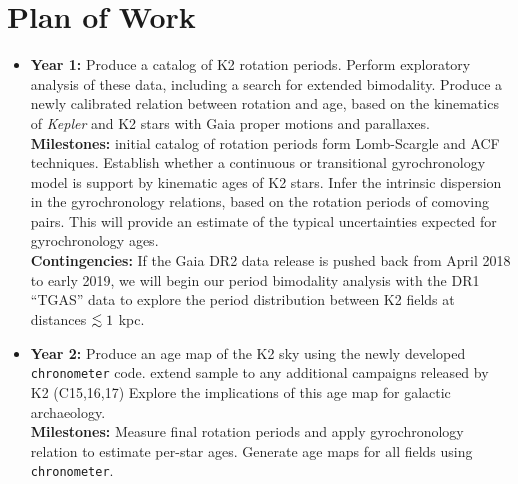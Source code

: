 \documentclass[12pt]{article}
\newcommand{\Kepler}{\textsl{Kepler}\xspace}
\def\lesssim{\mathrel{\hbox{\rlap{\hbox{\lower3pt\hbox{$\sim$}}}\hbox{\raise2pt\hbox{$<$}}}}}
\begin{document}
\section{Plan of Work}



\begin{itemize}
\item {\bf Year 1:} Produce a catalog of K2 rotation periods. Perform exploratory
analysis of these data, including a search for extended bimodality.
Produce a newly calibrated relation between rotation and age,
based on the kinematics of \Kepler and K2 stars with Gaia proper motions and
parallaxes.
\\
{\bf Milestones:} initial catalog of rotation periods form Lomb-Scargle and
        ACF techniques.
        Establish whether a continuous or transitional gyrochronology model is
        support by kinematic ages of K2 stars.
        Infer the intrinsic dispersion in the gyrochronology relations, based
        on the rotation periods of comoving pairs.
        This will provide an estimate of the typical uncertainties expected
        for gyrochronology ages.
\\
{\bf Contingencies:} If the Gaia DR2 data release is pushed back from April 2018 to early 2019, we will begin our period bimodality analysis with the DR1 ``TGAS'' data to explore the period distribution between K2 fields at distances $\lesssim 1$ kpc.
\item {\bf Year 2:} Produce an age map of the K2 sky using the newly developed
{\tt chronometer} code. extend sample to any additional campaigns released by K2 (C15,16,17)
Explore the implications of this age map for galactic archaeology.
\\
{\bf Milestones:} Measure final rotation periods and apply gyrochronology relation to estimate per-star ages. Generate age maps for all fields using {\tt chronometer}.
\end{itemize}

\clearpage


\end{document}
